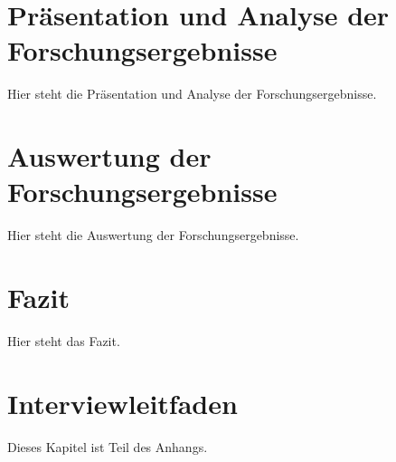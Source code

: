 \documentclass[11pt]{article}
\begin{document}
\clearpage

\section{Präsentation und Analyse der Forschungsergebnisse}
\label{sec:praesentation-und-analyse-der-forschungsergebnisse}

Hier steht die Präsentation und Analyse der Forschungsergebnisse.

\clearpage

\section{Auswertung der Forschungsergebnisse}
\label{sec:auswertung-der-forschungsergebnisse}

Hier steht die Auswertung der Forschungsergebnisse.

\clearpage

\section{Fazit}
\label{sec:fazit}

Hier steht das Fazit.

\clearpage

\makebibliography

\appendix

\section{Interviewleitfaden}
\label{sec:interviewleitfaden}

Dieses Kapitel ist Teil des Anhangs.

\clearpage
\end{document}
